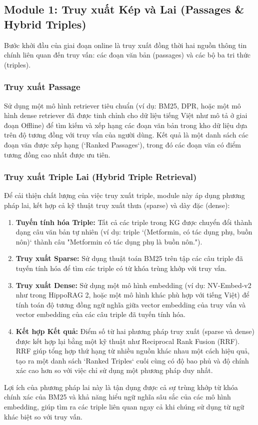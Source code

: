 \documentclass[../main.tex]{subfiles}
\begin{document}
\subsection{Module 1: Truy xuất Kép và Lai (Passages \& Hybrid Triples)}

Bước khởi đầu của giai đoạn online là truy xuất đồng thời hai nguồn thông tin chính liên quan đến truy vấn: các đoạn văn bản (passages) và các bộ ba tri thức (triples).

\subsubsection{Truy xuất Passage}

Sử dụng một mô hình retriever tiêu chuẩn (ví dụ: BM25, DPR, hoặc một mô hình dense retriever đã được tinh chỉnh cho dữ liệu tiếng Việt như mô tả ở giai đoạn Offline) để tìm kiếm và xếp hạng các đoạn văn bản trong kho dữ liệu dựa trên độ tương đồng với truy vấn của người dùng. Kết quả là một danh sách các đoạn văn được xếp hạng (`Ranked Passages`), trong đó các đoạn văn có điểm tương đồng cao nhất được ưu tiên.

\subsubsection{Truy xuất Triple Lai (Hybrid Triple Retrieval)}

Để cải thiện chất lượng của việc truy xuất triple, module này áp dụng phương pháp lai, kết hợp cả kỹ thuật truy xuất thưa (sparse) và dày đặc (dense):
\begin{enumerate}
    \item \textbf{Tuyến tính hóa Triple:} Tất cả các triple trong KG được chuyển đổi thành dạng câu văn bản tự nhiên (ví dụ: triple `(Metformin, có tác dụng phụ, buồn nôn)` thành câu "Metformin có tác dụng phụ là buồn nôn.").
    \item \textbf{Truy xuất Sparse:} Sử dụng thuật toán BM25 trên tập các câu triple đã tuyến tính hóa để tìm các triple có từ khóa trùng khớp với truy vấn.
    \item \textbf{Truy xuất Dense:} Sử dụng một mô hình embedding (ví dụ: NV-Embed-v2 như trong HippoRAG 2, hoặc một mô hình khác phù hợp với tiếng Việt) để tính toán độ tương đồng ngữ nghĩa giữa vector embedding của truy vấn và vector embedding của các câu triple đã tuyến tính hóa.
    \item \textbf{Kết hợp Kết quả:} Điểm số từ hai phương pháp truy xuất (sparse và dense) được kết hợp lại bằng một kỹ thuật như Reciprocal Rank Fusion (RRF). RRF giúp tổng hợp thứ hạng từ nhiều nguồn khác nhau một cách hiệu quả, tạo ra một danh sách `Ranked Triples` cuối cùng có độ bao phủ và độ chính xác cao hơn so với việc chỉ sử dụng một phương pháp duy nhất.
\end{enumerate}
Lợi ích của phương pháp lai này là tận dụng được cả sự trùng khớp từ khóa chính xác của BM25 và khả năng hiểu ngữ nghĩa sâu sắc của các mô hình embedding, giúp tìm ra các triple liên quan ngay cả khi chúng sử dụng từ ngữ khác biệt so với truy vấn.
\end{document}
